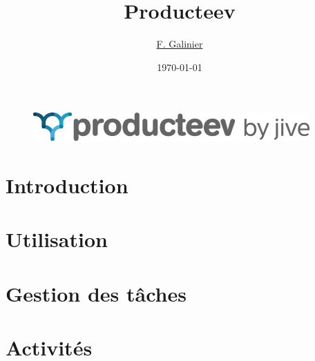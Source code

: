 \usepackage{listings}
\usepackage{hyperref}

\title{\textbf{Producteev}}
\author{
  \href{mailto:florian.galinier@etud.univ-montp2.fr}{F. Galinier}
}
\date{\today}



\begin{frame}
\titlepage
\end{frame}

\begin{frame}
   \begin{figure}
    \includegraphics[scale=0.50]{img/producteev.png}
  \end{figure}
\end{frame}

\section{Introduction}


\section{Utilisation}


\section{Gestion des tâches}


\section{Activités}



